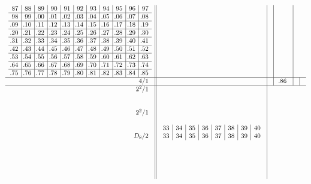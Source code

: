 \documentclass[11pt,a4paper]{amsart}
\begin{document}
\begin{align*}
\begin{array}{r||c|c|c|c|c}
\begin{array}{c|c|c|c|c|c|c|c|c|c|c}
87&88&89&90&91&92&93&94&95&96&97\\\hline
98&99&\llap.00&\llap.01&\llap.02&\llap.03&\llap.04&\llap.05&\llap.06&\llap.07&\llap.08\\\hline
\llap.09&\llap.10&\llap.11&\llap.12&\llap.13&\llap.14&\llap.15&\llap.16&\llap.17&\llap.18&\llap.19\\\hline
\llap.20&\llap.21&\llap.22&\llap.23&\llap.24&\llap.25&\llap.26&\llap.27&\llap.28&\llap.29&\llap.30\\\hline
\llap.31&\llap.32&\llap.33&\llap.34&\llap.35&\llap.36&\llap.37&\llap.38&\llap.39&\llap.40&\llap.41\\\hline
\llap.42&\llap.43&\llap.44&\llap.45&\llap.46&\llap.47&\llap.48&\llap.49&\llap.50&\llap.51&\llap.52\\\hline
\llap.53&\llap.54&\llap.55&\llap.56&\llap.57&\llap.58&\llap.59&\llap.60&\llap.61&\llap.62&\llap.63\\\hline
\llap.64&\llap.65&\llap.66&\llap.67&\llap.68&\llap.69&\llap.70&\llap.71&\llap.72&\llap.73&\llap.74\\\hline
\llap.75&\llap.76&\llap.77&\llap.78&\llap.79&\llap.80&\llap.81&\llap.82&\llap.83&\llap.84&\llap.85\\
       \end{array}
&&&\\\hline
    \begin{array}{r}
      4/1 \\
    \end{array}
    &&&
        \begin{array}{c}
          \llap.86 \\
        \end{array}
&&\\ \hline
    \begin{array}{r}
      2^2/1 \\ \\ \\ 2^2/1 \\ \\ \\ D_8/2 \\ \\ \\ \\ \\ \\
    \end{array}
    &
  \begin{array}{c|c|c|c|c|c|c|c}
33&34&35&36&37&38&39&40\\
33&34&35&36&37&38&39&40\\

\end{array}
\end{array}
\end{align*}
\end{document}
